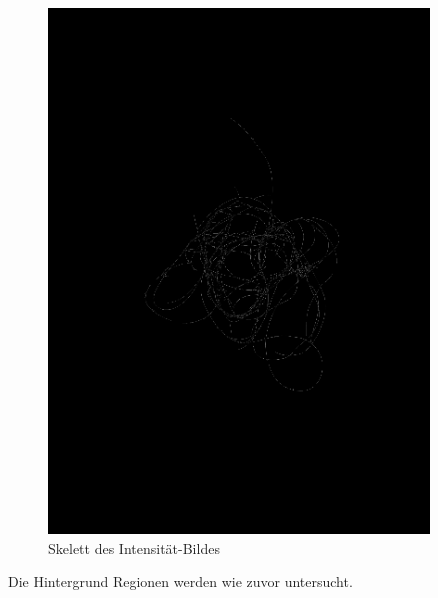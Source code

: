 \documentclass[german,a4paper,12pt]{llncs}
\begin{document}
\begin{figure}
	\centering
	\includegraphics[width=0.9\textwidth]{fig64/09input intensity.png}
	\caption[]{Skelett des Intensität-Bildes}
	\label{img:skel}
\end{figure}

Die Hintergrund Regionen werden wie zuvor untersucht.
\end{document}
